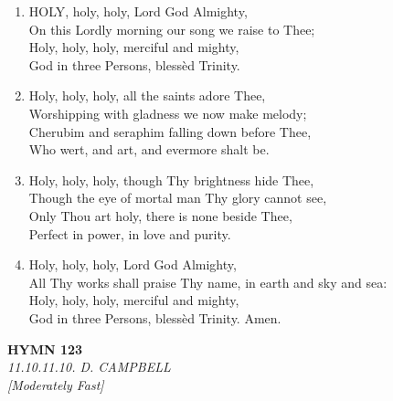 \documentclass[11pt,a4paper]{article}
\begin{document}
\begin{enumerate}
    \item HOLY, holy, holy, Lord God Almighty, \\
        On this Lordly morning our song we raise to Thee; \\
        Holy, holy, holy, merciful and mighty, \\
        God in three Persons, bless\`ed Trinity.

    \item Holy, holy, holy, all the saints adore Thee, \\
        Worshipping with gladness we now make melody; \\
        Cherubim and seraphim falling down before Thee, \\
        Who wert, and art, and evermore shalt be.

    \item Holy, holy, holy, though Thy brightness hide Thee, \\
        Though the eye of mortal man Thy glory cannot see, \\
        Only Thou art holy, there is none beside Thee, \\
        Perfect in power, in love and purity.

    \item Holy, holy, holy, Lord God Almighty, \\
        All Thy works shall praise Thy name, in earth and sky and sea: \\
        Holy, holy, holy, merciful and mighty, \\
        God in three Persons, bless\`ed Trinity. Amen.

\end{enumerate}

\newpage
\begin{center}
    {\Large \textbf{HYMN 123\textdagger{}}}
    \\
    \textit{11.10.11.10. D. CAMPBELL}
    \\
    \textit{\small [Moderately Fast]}
\end{center}
\vspace{1em}
\end{document}
